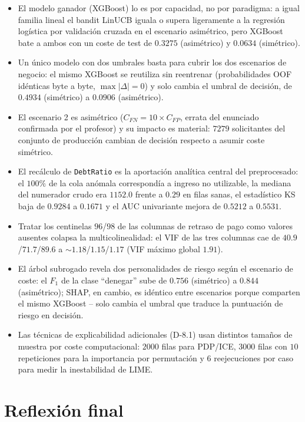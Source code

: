 \documentclass[11pt,a4paper]{article}
\begin{document}
\begin{itemize}
\item El modelo ganador (XGBoost) lo es por capacidad, no por paradigma: a igual familia lineal el
bandit LinUCB iguala o supera ligeramente a la regresión logística por validación cruzada en el
escenario asimétrico, pero XGBoost bate a ambos con un coste de test de $0.3275$ (asimétrico) y
$0.0634$ (simétrico).
\item Un único modelo con dos umbrales basta para cubrir los dos escenarios de negocio: el mismo
XGBoost se reutiliza sin reentrenar (probabilidades OOF idénticas byte a byte, $\max|\Delta|=0$) y
solo cambia el umbral de decisión, de $0.4934$ (simétrico) a $0.0906$ (asimétrico).
\item El escenario 2 es asimétrico ($C_{FN}=10 \times C_{FP}$, errata del enunciado confirmada por
el profesor) y su impacto es material: $7279$ solicitantes del conjunto de producción cambian de
decisión respecto a asumir coste simétrico.
\item El recálculo de \texttt{DebtRatio} es la aportación analítica central del preprocesado: el
$100\%$ de la cola anómala correspondía a ingreso no utilizable, la mediana del numerador crudo
era $1152.0$ frente a $0.29$ en filas sanas, el estadístico KS baja de $0.9284$ a $0.1671$ y el AUC
univariante mejora de $0.5212$ a $0.5531$.
\item Tratar los centinelas $96$/$98$ de las columnas de retraso de pago como valores ausentes
colapsa la multicolinealidad: el VIF de las tres columnas cae de $40.9$/$71.7$/$89.6$ a
$\sim 1.18$/$1.15$/$1.17$ (VIF máximo global $1.91$).
\item El árbol subrogado revela dos personalidades de riesgo según el escenario de coste: el $F_1$
de la clase ``denegar'' sube de $0.756$ (simétrico) a $0.844$ (asimétrico); SHAP, en cambio, es
idéntico entre escenarios porque comparten el mismo XGBoost -- solo cambia el umbral que traduce la
puntuación de riesgo en decisión.
\item Las técnicas de explicabilidad adicionales (D-8.1) usan distintos tamaños de muestra por coste
computacional: $2000$ filas para PDP/ICE, $3000$ filas con $10$ repeticiones para la importancia por
permutación y $6$ reejecuciones por caso para medir la inestabilidad de LIME.
\end{itemize}

\section{Reflexi\'on final}
\end{document}
